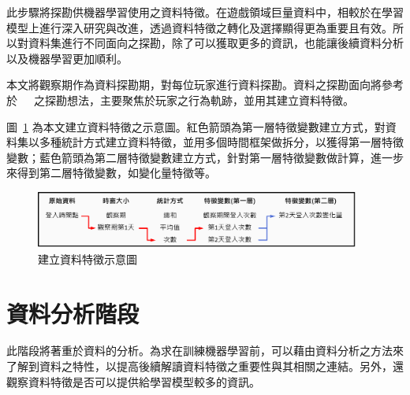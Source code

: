 此步驟將探勘供機器學習使用之資料特徵。在遊戲領域巨量資料中，相較於在學習模型上進行深入研究與改進，透過資料特徵之轉化及選擇顯得更為重要且有效。所以對資料集進行不同面向之探勘，除了可以獲取更多的資訊，也能讓後續資料分析以及機器學習更加順利。

本文將觀察期作為資料探勘期，對每位玩家進行資料探勘。資料之探勘面向將參考於~\cite{sifa2015predicting}~\cite{lee2016predicting}~\cite{martinez2020machine}之探勘想法，主要聚焦於玩家之行為軌跡，並用其建立資料特徵。

圖~\ref{fig:Image_FeatureEngineering} 為本文建立資料特徵之示意圖。紅色箭頭為第一層特徵變數建立方式，對資料集以多種統計方式建立資料特徵，並用多個時間框架做拆分，以獲得第一層特徵變數；藍色箭頭為第二層特徵變數建立方式，針對第一層特徵變數做計算，進一步來得到第二層特徵變數，如變化量特徵等。

\begin{figure}[!htb]
  \begin{center}
    \includegraphics[width=0.95\textwidth]{figures/Image_FeatureEngineering.png}
    \caption[建立資料特徵示意圖]{建立資料特徵示意圖}
    \label{fig:Image_FeatureEngineering}
  \end{center}
\end{figure}
\newpage



\section{資料分析階段}

此階段將著重於資料的分析。為求在訓練機器學習前，可以藉由資料分析之方法來了解到資料之特性，以提高後續解讀資料特徵之重要性與其相關之連結。另外，還觀察資料特徵是否可以提供給學習模型較多的資訊。

